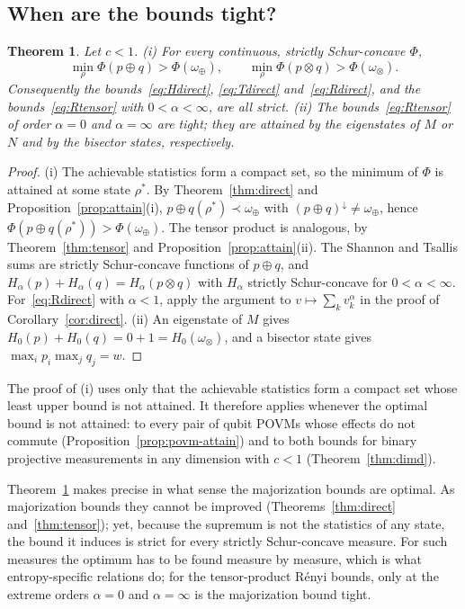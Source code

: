 \documentclass[aps,pra,twocolumn,superscriptaddress,nofootinbib,floatfix]{revtex4-2}
\newtheorem{theorem}{Theorem}
\theoremstyle{definition}
\newcommand{\maj}{\prec}
\newcommand{\omplus}{\omega_{\oplus}}
\newcommand{\omtimes}{\omega_{\otimes}}
\begin{document}
\subsection{When are the bounds tight?}

\begin{theorem}
\label{thm:tight}
Let $c<1$.
(i) For every continuous, strictly Schur-concave $\Phi$,
\begin{equation}
  \min_\rho\Phi(p\oplus q)>\Phi(\omplus),\qquad
  \min_\rho\Phi(p\otimes q)>\Phi(\omtimes).
\end{equation}
Consequently the bounds~\eqref{eq:Hdirect}, \eqref{eq:Tdirect}
and~\eqref{eq:Rdirect}, and the bounds~\eqref{eq:Rtensor} with
$0<\alpha<\infty$, are all strict.
(ii) The bounds~\eqref{eq:Rtensor} of order $\alpha=0$ and $\alpha=\infty$ are
tight; they are attained by the eigenstates of $M$ or $N$ and by the bisector
states, respectively.
\end{theorem}

\begin{proof}
(i) The achievable statistics form a compact set, so the minimum of $\Phi$ is
attained at some state $\rho^\ast$. By Theorem~\ref{thm:direct} and
Proposition~\ref{prop:attain}(i), $p\oplus q(\rho^\ast)\maj\omplus$ with
$(p\oplus q)^\downarrow\neq\omplus$, hence $\Phi(p\oplus q(\rho^\ast))>\Phi(\omplus)$.
The tensor product is analogous, by Theorem~\ref{thm:tensor} and
Proposition~\ref{prop:attain}(ii). The Shannon and Tsallis sums are strictly
Schur-concave functions of $p\oplus q$, and $H_\alpha(p)+H_\alpha(q)=H_\alpha(p\otimes q)$
with $H_\alpha$ strictly Schur-concave for $0<\alpha<\infty$. For~\eqref{eq:Rdirect}
with $\alpha<1$, apply the argument to $v\mapsto\sum_kv_k^\alpha$ in the proof of
Corollary~\ref{cor:direct}.
(ii) An eigenstate of $M$ gives $H_0(p)+H_0(q)=0+1=H_0(\omtimes)$, and a bisector
state gives $\max_ip_i\max_jq_j=w$.
\end{proof}

The proof of (i) uses only that the achievable statistics form a compact set
whose least upper bound is not attained. It therefore applies whenever the
optimal bound is not attained: to every pair of qubit POVMs whose effects do not
commute (Proposition~\ref{prop:povm-attain}) and to both bounds for binary
projective measurements in any dimension with $c<1$ (Theorem~\ref{thm:dimd}).

Theorem~\ref{thm:tight} makes precise in what sense the majorization bounds are
optimal. As majorization bounds they cannot be improved
(Theorems~\ref{thm:direct} and~\ref{thm:tensor}); yet, because the supremum is
not the statistics of any state, the bound it induces is strict for every
strictly Schur-concave measure. For such measures the optimum has to be found
measure by measure, which is what entropy-specific relations do; for the
tensor-product R\'enyi bounds, only at the extreme orders $\alpha=0$ and
$\alpha=\infty$ is the majorization bound tight.
\end{document}
